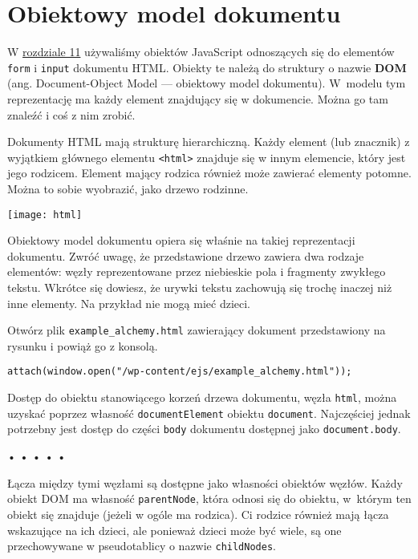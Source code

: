 \chapter{ Obiektowy model dokumentu}
\label{chap:12}

  
W \hyperref[chap:11]{rozdziale 11} używaliśmy obiektów JavaScript odnoszących się do elementów \texttt{form} i \texttt{input} dokumentu HTML. Obiekty te należą do struktury o nazwie \textbf{DOM} (ang. Document-Object Model — obiektowy model dokumentu). W~modelu tym reprezentację ma każdy element znajdujący się w dokumencie. Można go tam znaleźć i coś z nim zrobić.

  
Dokumenty HTML mają strukturę hierarchiczną. Każdy element (lub znacznik) z wyjątkiem głównego elementu \texttt{<html>} znajduje się w innym elemencie, który jest jego rodzicem. Element mający rodzica również może zawierać elementy potomne. Można to sobie wyobrazić, jako drzewo rodzinne.

\bigskip 
\centerline{\texttt{[image: html]}} 
\smallskip
  
Obiektowy model dokumentu opiera się właśnie na takiej reprezentacji dokumentu. Zwróć uwagę, że przedstawione drzewo zawiera dwa rodzaje elementów: węzły reprezentowane przez niebieskie pola i fragmenty zwykłego tekstu. Wkrótce się dowiesz, że urywki tekstu zachowują się trochę inaczej niż inne elementy. Na przykład nie mogą mieć dzieci.

  
Otwórz plik \texttt{example\_alchemy.html} zawierający dokument przedstawiony na  rysunku i powiąż go z konsolą.

  
\begin{verbatim} 
attach(window.open("/wp-content/ejs/example_alchemy.html"));
 \end{verbatim}
  
Dostęp do obiektu stanowiącego korzeń drzewa dokumentu, węzła \texttt{html}, można uzyskać poprzez własność \texttt{documentElement} obiektu \texttt{document}. Najczęściej jednak potrzebny jest dostęp do części \texttt{body} dokumentu dostępnej jako \texttt{document.body}.



\begin{center}
• • • • •
\end{center}

  
Łącza między tymi węzłami są dostępne jako własności obiektów węzłów. Każdy obiekt DOM ma własność \texttt{parentNode}, która odnosi się do obiektu, w~którym ten obiekt się znajduje (jeżeli w ogóle ma rodzica). Ci rodzice również mają łącza wskazujące na ich dzieci, ale ponieważ dzieci może być wiele, są one przechowywane w pseudotablicy o nazwie \texttt{childNodes}.

